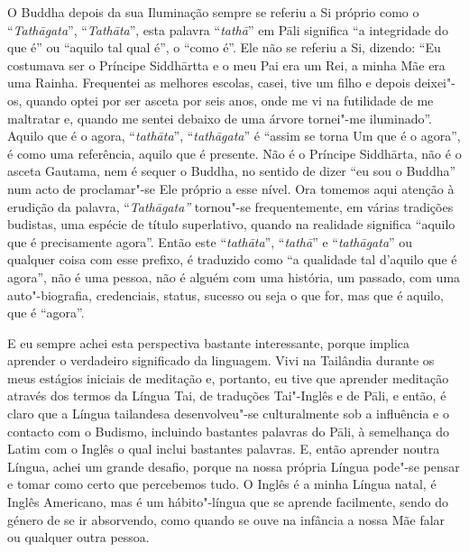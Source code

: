 O Buddha depois da sua Iluminação sempre se referiu a Si próprio como o
``\emph{Tathāgata}'', ``\emph{Tathāta}'', esta palavra ``\emph{tathā}''
em Pāli significa ``a integridade do que é'' ou ``aquilo tal qual é'', o
``como é''. Ele não se referiu a Si, dizendo: ``Eu costumava ser o
Príncipe Siddhārtta e o meu Pai era um Rei, a minha Mãe era uma Rainha.
Frequentei as melhores escolas, casei, tive um filho e depois deixei"-os,
quando optei por ser asceta por seis anos, onde me vi na futilidade de
me maltratar e, quando me sentei debaixo de uma árvore tornei"-me
iluminado''. Aquilo que é o agora, ``\emph{tathāta}'',
``\emph{tathāgata}'' é ``assim se torna Um que é o agora'', é como uma
referência, aquilo que é presente. Não é o Príncipe Siddhārta, não é o
asceta Gautama, nem é sequer o Buddha, no sentido de dizer ``eu sou o
Buddha'' num acto de proclamar"-se Ele próprio a esse nível. Ora tomemos
aqui atenção à erudição da palavra, ``\emph{Tathāgata''} tornou"-se
frequentemente, em várias tradições budistas, uma espécie de título
superlativo, quando na realidade significa ``aquilo que é precisamente
agora''. Então este ``\emph{tathāta}'', ``\emph{tathā}'' e
``\emph{tathāgata}'' ou qualquer coisa com esse prefixo, é traduzido
como ``a qualidade tal d'aquilo que é agora'', não é uma pessoa, não é
alguém com uma história, um passado, com uma auto"-biografia,
credenciais, status, sucesso ou seja o que for, mas que é aquilo, que é
``agora''.

E eu sempre achei esta perspectiva bastante interessante, porque implica
aprender o verdadeiro significado da linguagem. Vivi na Tailândia
durante os meus estágios iniciais de meditação e, portanto, eu tive que
aprender meditação através dos termos da Língua Tai, de traduções
Tai"-Inglês e de Pāli, e então, é claro que a Língua tailandesa
desenvolveu"-se culturalmente sob a influência e o contacto com o
Budismo, incluindo bastantes palavras do Pāli, à semelhança do Latim com
o Inglês o qual inclui bastantes palavras. E, então aprender noutra
Língua, achei um grande desafio, porque na nossa própria Língua pode"-se
pensar e tomar como certo que percebemos tudo. O Inglês é a minha Língua
natal, é Inglês Americano, mas é um hábito"-língua que se aprende
facilmente, sendo do género de se ir absorvendo, como quando se ouve na
infância a nossa Mãe falar ou qualquer outra pessoa.

